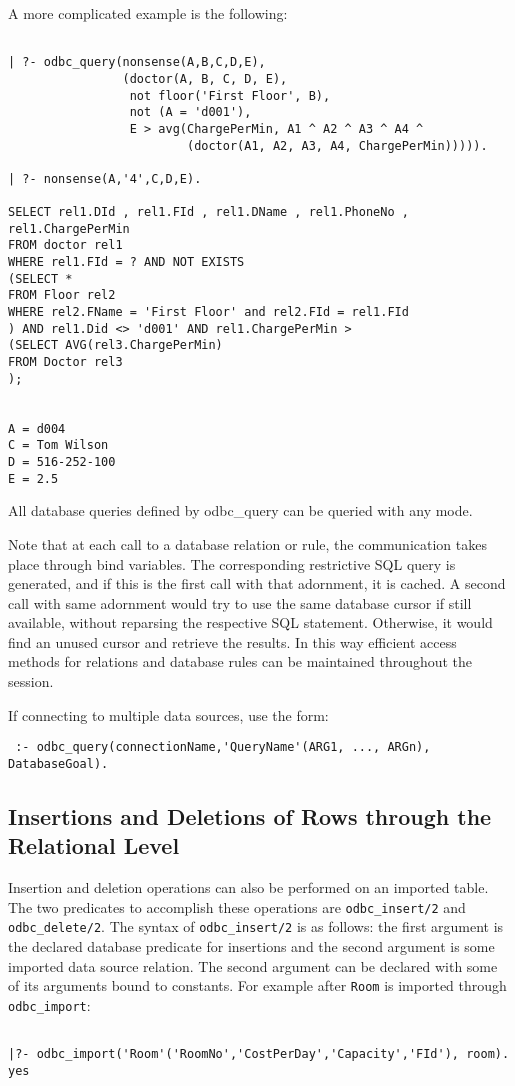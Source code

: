 A more complicated example is the following:
\begin{verbatim}

| ?- odbc_query(nonsense(A,B,C,D,E),
                (doctor(A, B, C, D, E), 
                 not floor('First Floor', B), 
                 not (A = 'd001'), 
                 E > avg(ChargePerMin, A1 ^ A2 ^ A3 ^ A4 ^
                         (doctor(A1, A2, A3, A4, ChargePerMin))))).

| ?- nonsense(A,'4',C,D,E).

SELECT rel1.DId , rel1.FId , rel1.DName , rel1.PhoneNo , rel1.ChargePerMin
FROM doctor rel1
WHERE rel1.FId = ? AND NOT EXISTS
(SELECT *
FROM Floor rel2
WHERE rel2.FName = 'First Floor' and rel2.FId = rel1.FId
) AND rel1.Did <> 'd001' AND rel1.ChargePerMin >
(SELECT AVG(rel3.ChargePerMin)
FROM Doctor rel3
);


A = d004
C = Tom Wilson
D = 516-252-100
E = 2.5
\end{verbatim}

All database queries defined by odbc\_query can be queried with any mode.

Note that at each call to a database relation or rule, the
communication takes place through bind variables.  The corresponding
restrictive SQL query is generated, and if this is the first call with
that adornment, it is cached.  A second call with same adornment would
try to use the same database cursor if still available, without
reparsing the respective SQL statement.  Otherwise, it would find an
unused cursor and retrieve the results.  In this way efficient access
methods for relations and database rules can be maintained throughout
the session.

If connecting to multiple data sources, use the form:
\begin{verbatim}
 :- odbc_query(connectionName,'QueryName'(ARG1, ..., ARGn), DatabaseGoal).
\end{verbatim}


\subsection{Insertions and Deletions of Rows through the Relational Level}

Insertion and deletion operations can also be performed on an imported
table.  The two predicates to accomplish these operations are 
{\tt odbc\_insert/2} and {\tt odbc\_delete/2}.  The syntax of 
{\tt odbc\_insert/2} is as follows: the first argument is the declared 
database predicate for insertions and the second argument
is some imported data source relation.  The second argument can be 
declared with some of its arguments bound to constants.  For example 
after {\tt Room} is imported through {\tt odbc\_import}:
\begin{verbatim}

|?- odbc_import('Room'('RoomNo','CostPerDay','Capacity','FId'), room).
yes 
\end{verbatim}

